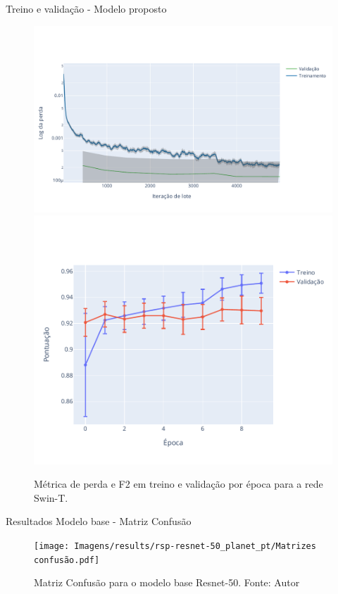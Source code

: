 \documentclass{beamer}
\begin{document}
\begin{frame}{Treino e validação - Modelo proposto}    
\begin{figure}[!ht]
    \centering
    \includegraphics[width=0.55\columnwidth]{Imagens/results/rsp-resnet-50_planet_pt/Training Loss Per Minibatch.pdf}
    \label{fig:LossTrainSwin}
    \centering
    \includegraphics[width=0.40\columnwidth]{Imagens/results/rsp-swin-t_planet_pt/Pontuação em treino e validação por época.pdf}
    \caption{ Métrica de perda e F2 em treino e validação por época para a rede Swin-T.}
    \label{fig:PontuacaoTrainSwin}
\end{figure}  

\end{frame}



\begin{frame}{Resultados Modelo base - Matriz Confusão}
    \begin{figure}[!ht]
        \centering
        \texttt{[image: Imagens/results/rsp-resnet-50\_planet\_pt/Matrizes confusão.pdf]}
        \caption{ Matriz Confusão para o modelo base Resnet-50. Fonte: Autor}
        \label{fig:Matriz Confusao Resnet50}
    \end{figure}     
\end{frame}     
\end{document}
